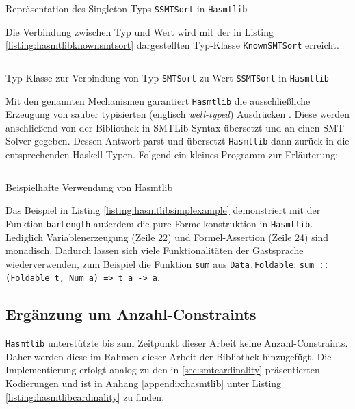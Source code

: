\begin{listing}[H]
    \inputminted[linenos=true]{haskell}{Code/Implementierung/Hasmtlib/SSMTSort.hs}
    \caption{Repräsentation des Singleton-Typs \texttt{SSMTSort} in \texttt{Hasmtlib} \cite{hasmtlibSSMTSort}}
    \label{listing:hasmtlibssmtsort}
\end{listing}

Die Verbindung zwischen Typ und Wert wird mit der in Listing \ref{listing:hasmtlibknownsmtsort} dargestellten Typ-Klasse \texttt{KnownSMTSort} erreicht.

\begin{listing}[H]
    \inputminted[linenos=true]{haskell}{Code/Implementierung/Hasmtlib/KnownSMTSort.hs}
    \caption{Typ-Klasse zur Verbindung von Typ \texttt{SMTSort} zu Wert \texttt{SSMTSort} in \texttt{Hasmtlib} \cite{hasmtlibKnownSMTSort}}
    \label{listing:hasmtlibknownsmtsort}
\end{listing}

Mit den genannten Mechanismen garantiert \texttt{Hasmtlib} die ausschließliche Erzeugung von sauber typisierten (englisch \textit{well-typed}) Ausdrücken \cite{gadts}.
Diese werden anschließend von der Bibliothek in SMTLib-Syntax übersetzt und an einen SMT-Solver gegeben.
Dessen Antwort parst und übersetzt \texttt{Hasmtlib} dann zurück in die entsprechenden Haskell-Typen.
Folgend ein kleines Programm zur Erläuterung:

\begin{listing}[H]
    \inputminted[linenos=true]{haskell}{Code/Implementierung/Hasmtlib/BeispielSimple.hs}
    \caption{Beispielhafte Verwendung von Hasmtlib}
    \label{listing:hasmtlibsimplexample}
\end{listing}

Das Beispiel in Listing \ref{listing:hasmtlibsimplexample} demonstriert mit der Funktion \texttt{barLength} außerdem die pure Formelkonstruktion in \texttt{Hasmtlib}.
Lediglich Variablenerzeugung (Zeile 22) und Formel-Assertion (Zeile 24) sind monadisch.
Dadurch lassen sich viele Funktionalitäten der Gastsprache wiederverwenden, zum Beispiel die Funktion \texttt{sum} aus \texttt{Data.Foldable}:
\texttt{sum :: (Foldable t, Num a) => t a -> a}.

\subsection{Ergänzung um Anzahl-Constraints}
\label{subsec:implCardinality}
\texttt{Hasmtlib} unterstützte bis zum Zeitpunkt dieser Arbeit keine Anzahl-Constraints.
Daher werden diese im Rahmen dieser Arbeit der Bibliothek hinzugefügt.
Die Implementierung erfolgt analog zu den in \ref{sec:smtcardinality} präsentierten Kodierungen und ist in
Anhang \ref{appendix:hasmtlib} unter Listing \ref{listing:hasmtlibcardinality} zu finden.

